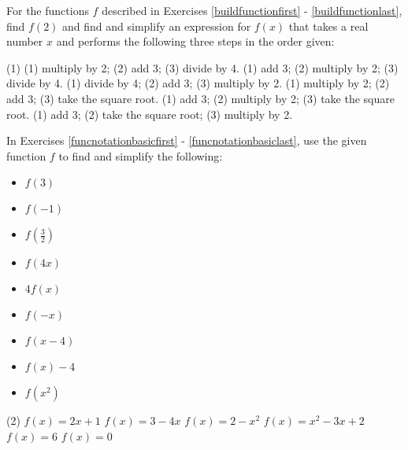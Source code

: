 For the functions $f$ described in Exercises \ref{buildfunctionfirst} - \ref{buildfunctionlast}, find $f(2)$ and find and simplify an expression for $f(x)$ that takes a real number $x$ and performs the following three steps in the order given: 


\begin{tasks}[resume](1)
\task  (1) multiply by 2; (2) add 3; (3) divide by 4. \label{buildfunctionfirst}
\task  (1) add 3; (2) multiply by 2; (3) divide by 4. 
\task (1) divide by 4; (2) add 3; (3) multiply by 2.
\task (1) multiply by 2; (2) add 3; (3) take the square root.
\task  (1) add 3; (2) multiply by 2; (3) take the square root.
\task  (1) add 3; (2) take the square root; (3) multiply by 2.  \label{buildfunctionlast}
\end{tasks}


In Exercises \ref{funcnotationbasicfirst} - \ref{funcnotationbasiclast}, use the given function $f$ to find and simplify the following:

\begin{multicols}{3}
\begin{itemize}
\item $f(3)$
\item $f(-1)$
\item $f\left(\frac{3}{2} \right)$
\end{itemize}
\end{multicols}

\begin{multicols}{3}
\begin{itemize}
\item  $f(4x)$
\item $4f(x)$
\item $f(-x)$
\end{itemize}
\end{multicols}

\begin{multicols}{3}
\begin{itemize}
\item  $f(x-4)$
\item $f(x) - 4$
\item  $f\left(x^2\right)$
\end{itemize}
\end{multicols}

\begin{tasks}[resume](2)
\task $f(x) = 2x+1$ \label{funcnotationbasicfirst} 
\task $f(x) = 3 - 4x$
\task $f(x) = 2 - x^2$
\task $f(x) = x^2 - 3x + 2$
\task $f(x) = 6$
\task $f(x) = 0$ \label{funcnotationbasiclast}
\end{tasks}

